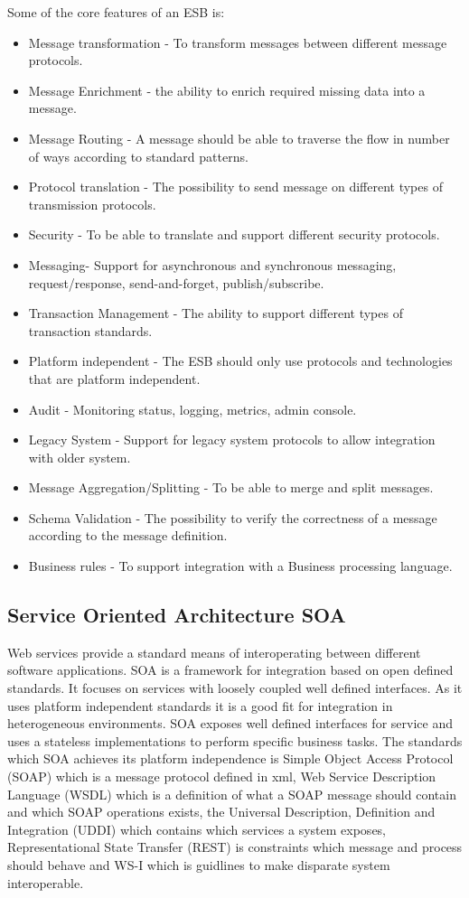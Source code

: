 \documentclass{llncs}
\begin{document}
Some of the core features of an ESB is:
\begin{itemize}
\item Message transformation - To transform messages between different message protocols.
\item Message Enrichment - the ability to enrich required missing data into a message.
\item Message Routing - A message should be able to traverse the flow in number of ways according to standard patterns.
\item Protocol translation - The possibility to send message on different types of transmission protocols.
\item Security - To be able to translate and support different security protocols.
\item Messaging- Support for asynchronous and synchronous messaging, request/response, send-and-forget, publish/subscribe.
\item Transaction Management - The ability to support different types of transaction standards.
\item Platform independent - The ESB should only use protocols and technologies that are platform independent.
\item Audit - Monitoring status, logging, metrics, admin console.
\item Legacy System - Support for legacy system protocols to allow integration with older system.
\item Message Aggregation/Splitting - To be able to merge and split messages.
\item Schema Validation - The possibility to verify the correctness of a message according to the message definition.
\item Business rules - To support integration with a Business processing language.
\end{itemize}



\subsection{Service Oriented Architecture SOA}
Web services provide a standard means of interoperating between different software applications\cite{w3csoa}. SOA is a framework for integration based on open defined standards. It focuses on services with  loosely coupled well defined interfaces. As it uses platform independent standards it is a good fit for integration in heterogeneous environments. SOA exposes well defined interfaces for service and uses a stateless implementations to perform specific business tasks. The standards which SOA achieves its platform independence is Simple Object Access Protocol (SOAP) which is a message protocol defined in xml, Web Service Description Language (WSDL) which is a definition of what a SOAP message should contain and which SOAP operations exists, the Universal Description, Definition and Integration (UDDI) which contains which services a system exposes, Representational State Transfer (REST) is constraints which message and process should behave and WS-I which is guidlines to make disparate system interoperable.
\end{document}
